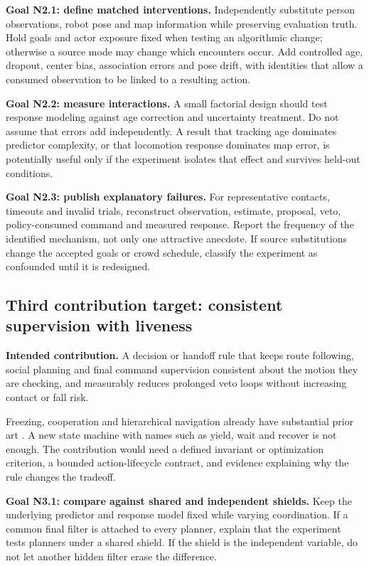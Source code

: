\textbf{Goal N2.1: define matched interventions.} Independently substitute
person observations, robot pose and map information while preserving evaluation
truth. Hold goals and actor exposure fixed when testing an algorithmic change;
otherwise a source mode may change which encounters occur. Add controlled age,
dropout, center bias, association errors and pose drift, with identities that
allow a consumed observation to be linked to a resulting action.

\textbf{Goal N2.2: measure interactions.} A small factorial design should test
response modeling against age correction and uncertainty treatment. Do not assume
that errors add independently. A result that tracking age dominates predictor
complexity, or that locomotion response dominates map error, is potentially useful
only if the experiment isolates that effect and survives held-out conditions.

\textbf{Goal N2.3: publish explanatory failures.} For representative contacts,
timeouts and invalid trials, reconstruct observation, estimate, proposal, veto,
policy-consumed command and measured response. Report the frequency of the
identified mechanism, not only one attractive anecdote. If source substitutions
change the accepted goals or crowd schedule, classify the experiment as
confounded until it is redesigned.

\subsection{Third contribution target: consistent supervision with liveness}
\label{goal:liveness}
\textbf{Intended contribution.} A decision or handoff rule that keeps route
following, social planning and final command supervision consistent about the
motion they are checking, and measurably reduces prolonged veto loops without
increasing contact or fall risk.

Freezing, cooperation and hierarchical navigation already have substantial prior
art \citep{freezing,rgl,biped2016,wheeledleg}. A new state machine with names such
as yield, wait and recover is not enough. The contribution would need a defined
invariant or optimization criterion, a bounded action-lifecycle contract, and
evidence explaining why the rule changes the tradeoff.

\textbf{Goal N3.1: compare against shared and independent shields.} Keep the
underlying predictor and response model fixed while varying coordination. If a
common final filter is attached to every planner, explain that the experiment
tests planners under a shared shield. If the shield is the independent variable,
do not let another hidden filter erase the difference.


